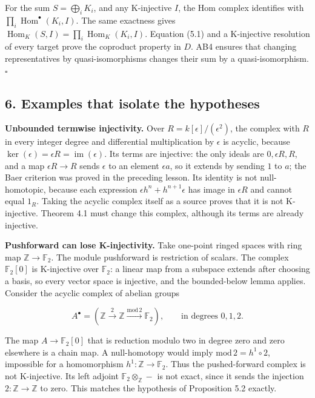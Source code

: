 \documentclass[
  english,
  11pt,
  a4paper,
]{article}
\begin{document}
For the sum \(S=\bigoplus_i K_i\), and any K-injective \(I\), the Hom
complex identifies with \(\prod_i\operatorname{Hom}^\bullet(K_i,I)\).
The same exactness gives
\(\operatorname{Hom}_K(S,I)=\prod_i\operatorname{Hom}_K(K_i,I)\).
Equation (5.1) and a K-injective resolution of every target prove the
coproduct property in \(D\). AB4 ensures that changing representatives
by quasi-isomorphisms changes their sum by a quasi-isomorphism.
\(\square\)

\subsection{6. Examples that isolate the
hypotheses}\label{k-injective-resolutions-in-grothendieck-categories--6-examples-that-isolate-the-hypotheses}

\textbf{Unbounded termwise injectivity.} Over
\(R=k[\epsilon]/(\epsilon^2)\), the complex with \(R\) in every integer
degree and differential multiplication by \(\epsilon\) is acyclic,
because \(\ker(\epsilon)=\epsilon R=\operatorname{im}(\epsilon)\). Its
terms are injective: the only ideals are \(0,\epsilon R,R\), and a map
\(\epsilon R\to R\) sends \(\epsilon\) to an element \(\epsilon a\), so
it extends by sending \(1\) to \(a\); the Baer criterion was proved in
the preceding lesson. Its identity is not null-homotopic, because each
expression \(\epsilon h^n+h^{n+1}\epsilon\) has image in \(\epsilon R\)
and cannot equal \(1_R\). Taking the acyclic complex itself as a source
proves that it is not K-injective. Theorem 4.1 must change this complex,
although its terms are already injective.

\textbf{Pushforward can lose K-injectivity.} Take one-point ringed
spaces with ring map \(\mathbb Z\to\mathbb F_2\). The module pushforward
is restriction of scalars. The complex \(\mathbb F_2[0]\) is K-injective
over \(\mathbb F_2\): a linear map from a subspace extends after
choosing a basis, so every vector space is injective, and the
bounded-below lemma applies. Consider the acyclic complex of abelian
groups

\[A^\bullet=(\mathbb Z\xrightarrow{2}\mathbb Z
\xrightarrow{\mathrm{mod}\,2}\mathbb F_2),
\qquad\text{in degrees }0,1,2.\]

The map \(A\to\mathbb F_2[0]\) that is reduction modulo two in degree
zero and zero elsewhere is a chain map. A null-homotopy would imply
\(\mathrm{mod}\,2=h^1\circ2\), impossible for a homomorphism
\(h^1:\mathbb Z\to\mathbb F_2\). Thus the pushed-forward complex is not
K-injective. Its left adjoint \(\mathbb F_2\otimes_{\mathbb Z}-\) is not
exact, since it sends the injection \(2:\mathbb Z\to\mathbb Z\) to zero.
This matches the hypothesis of Proposition 5.2 exactly.
\end{document}
